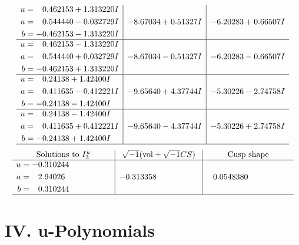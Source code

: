 \documentclass[1p]{elsarticle_modified}
\theoremstyle{definition}
\newcommand{\I}{\sqrt{-1}}
\begin{document}
$$\begin{array}{c|c|c}
\begin{aligned}
u &= \phantom{-}0.462153 + 1.313220 I \\
a &= \phantom{-}0.544440 - 0.032729 I \\
b &= -0.462153 - 1.313220 I\end{aligned}
 & -8.67034 + 0.51327 I & -6.20283 + 0.66507 I \\ \hline\begin{aligned}
u &= \phantom{-}0.462153 - 1.313220 I \\
a &= \phantom{-}0.544440 + 0.032729 I \\
b &= -0.462153 + 1.313220 I\end{aligned}
 & -8.67034 - 0.51327 I & -6.20283 - 0.66507 I \\ \hline\begin{aligned}
u &= \phantom{-}0.24138 + 1.42400 I \\
a &= \phantom{-}0.411635 - 0.412221 I \\
b &= -0.24138 - 1.42400 I\end{aligned}
 & -9.65640 + 4.37744 I & -5.30226 - 2.74758 I \\ \hline\begin{aligned}
u &= \phantom{-}0.24138 - 1.42400 I \\
a &= \phantom{-}0.411635 + 0.412221 I \\
b &= -0.24138 + 1.42400 I\end{aligned}
 & -9.65640 - 4.37744 I & -5.30226 + 2.74758 I\\
 \hline 
 \end{array}$$\newpage$$\begin{array}{c|c|c}  
\text{Solutions to }I^u_{3}& \I (\text{vol} + \sqrt{-1}CS) & \text{Cusp shape}\\
 \hline 
\begin{aligned}
u &= -0.310244\phantom{ +0.000000I} \\
a &= \phantom{-}2.94026\phantom{ +0.000000I} \\
b &= \phantom{-}0.310244\phantom{ +0.000000I}\end{aligned}
 & -0.313358\phantom{ +0.000000I} & \phantom{-}0.0548380\phantom{ +0.000000I}\\
 \hline 
 \end{array}$$\newpage
\newpage\renewcommand{\arraystretch}{1}
\centering \section*{ IV. u-Polynomials}
\end{document}

